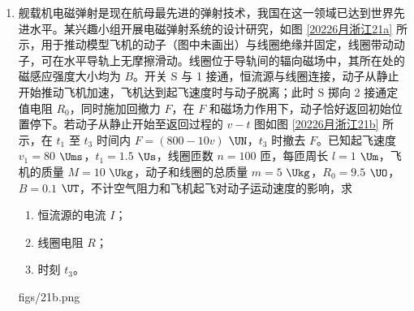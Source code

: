 \documentclass[\gkver]{gaokaozhenti}
\begin{document}
\begin{enumerate}
{	解得

	$s_{3} = 0.4$ $\Um$

	距离 C 点 $0.6$ $\Um$，综上可知当 $0.9$ $\Um$ $< h < 1.2$ $\Um$ 时

	$3l - s_{3} \leq x \leq 3l$

	代入数据得

	$2.6$ $\Um$ $\leqslant x \leqslant 3$ $\Um$
}

\item
舰载机电磁弹射是现在航母最先进的弹射技术，我国在这一领域已达到世界先进水平。某兴趣小组开展电磁弹射系统的设计研究，如图 \ref{20226月浙江21a} 所示，用于推动模型飞机的动子（图中未画出）与线圈绝缘并固定，线圈带动动子，可在水平导轨上无摩擦滑动。线圈位于导轨间的辐向磁场中，其所在处的磁感应强度大小均为 $B$。开关 S 与 1 接通，恒流源与线圈连接，动子从静止开始推动飞机加速，飞机达到起飞速度时与动子脱离；此时 S 掷向 2 接通定值电阻 $R_{0}$，同时施加回撤力 $F$，在 $F$ 和磁场力作用下，动子恰好返回初始位置停下。若动子从静止开始至返回过程的 $v-t$ 图如图 \ref{20226月浙江21b} 所示，在 $t_{1}$ 至 $t_{3}$ 时间内 $F = (800 - 10v)$ $\UN$，$t_{3}$ 时撤去 $F$。已知起飞速度 $v_{1} = 80$ $\Ums$，$t_{1} = 1.5$ $\Us$，线圈匝数 $n = 100$ 匝，每匝周长 $l = 1$ $\Um$，飞机的质量 $M = 10$ $\Ukg$，动子和线圈的总质量 $m = 5$ $\Ukg$，$R_{0} = 9.5$ $\UO$，$B = 0.1$ $\UT$，不计空气阻力和飞机起飞对动子运动速度的影响，求
\begin{enumerate}
	\item
	恒流源的电流 $I$；
	\item
	线圈电阻 $R$；
	\item
	时刻 $t_{3}$。
\end{enumerate}
{figs/21b.png}

\end{enumerate}
\end{document}

